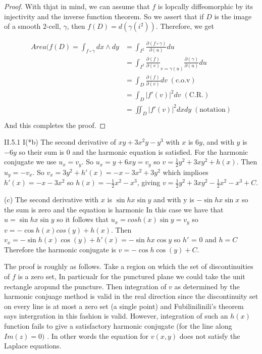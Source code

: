 \documentclass[letter]{article}
\newenvironment{menumerate}{%
  \edef\backupindent{\the\parindent}%
  \enumerate%
  \setlength{\parindent}{\backupindent}%
}{\endenumerate}
\begin{document}
\begin{menumerate}
\begin{proof}
    With thjat in mind, we can assume that $f$ is lopcally diffeomorphic by its injectivity and the inverse function theorem.
    So we assert that if $D$ is the image of a smooth $2$-cell, $\gamma$, then $f(D) = d(\gamma(i^2)).$
    Therefore, we get

    \begin{equation}
        \begin{aligned}
            Area(f(D) = \int_{f\circ \gamma} dx\wedge dy &= \int_{I^2} \frac{\partial(f \circ \gamma)}{\partial(u)} du \\
            &= \int_{I^2} \frac{\partial(f)}{\partial(v)}_{v=\gamma(u)}\frac{\partial(\gamma)}{\partial(u)}  du \\
            &= \int_{D} \frac{\partial(f)}{\partial(v)} dv\;(\mathrm{c.o.v}) \\
            &= \int_{D} |f'(v)|^2 dv\;(\mathrm{C.R.}) \\
            &= \iint_{D} |f'(v)|^2 dxdy\;(\mathrm{notation}) \\
        \end{aligned}
    \end{equation}
    And this completes the proof.
\end{proof}
\item II.5.1
I(*b) The second derivative of $xy + 3x^2y - y^3$ with $x$ is $6y$, and with $y$ is $-6y$ so their sum is
$0$ and the harmonic equation is satisfied. For the harmonic conjugate we use $u_x = v_y.$
So $u_x = y + 6xy = v_y$ so $v = \frac 12 y^2 + 3xy^2 + h(x).$ Then $u_y = -v_x.$ So 
$v_x = 3y^2 + h'(x) = -x - 3x^2 + 3y^2$ which implioes $h'(x) = -x -3x^2$ so $h(x) = -\frac12 x^2 -x^3$,
giving $v =  \frac12 y^2 + 3xy^2 - \frac12 x^2 - x^3 + C.$ 

(c) The second derivative with $x$ is $\sin hx \sin y$ and with y is $-\sin h x \sin x$ so the sum is zero and the
equation is harmonic  In this case we have that $u = \sin hx \sin y$ so it follows that $u_x = cosh(x)\sin y = v_y$ 
so $v = -\cos h(x) cos(y) + h(x).$ Then $v_x = -\sin h(x) \cos(y) + h'(x) = -\sin hx \cos y $ so $h'$ = 0 and $h = C$
Therefore the harmonic conjugate is $v = -\cos h \cos(y) + C.$
\item The proof is roughly as follows. Take a region on which the set of discontinuities of $f$ is a zero set,
In particualr for the punctured plane we could take the unit rectangle aropund the puncture. Then integration of $v$ as
determined by the harmonic conjuage method is valid in the real direction since the discontinuity set on every line is 
at most a zero set (a single point) and Fubilinilinili's theorem says intergration in this fashion is valid.
However, integration of such an $h(x)$ function fails to give a satisfactory harmonic conjugate (for the line along $Im(z) = 0)$
. In other words the equation for $v(x,y)$ does not satisfy the Laplace equations.


\end{menumerate}
\end{document}
